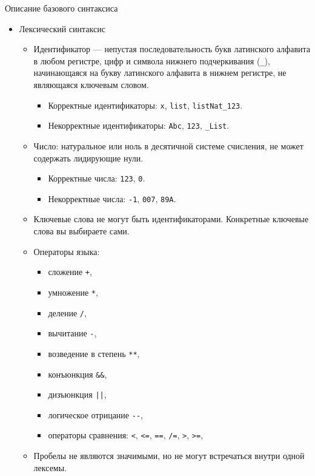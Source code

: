 \begin{center}
  {\Large Описание базового синтаксиса}
\end{center}
\begin{itemize}
  \item Лексический синтаксис
  \begin{itemize}
    \item Идентификатор --- непустая последовательность букв латинского алфавита в любом регистре, цифр и символа нижнего подчеркивания (\verb!_!), начинающаяся на букву латинского алфавита в нижнем регистре, не являющаяся ключевым словом.
    \begin{itemize}
      \item Корректные идентификаторы: \verb!x!, \verb!list!, \verb!listNat_123!.
      \item Некорректные идентификаторы: \verb!Abc!, \verb!123!, \verb!_List!.
    \end{itemize}
    \item Число: натуральное или ноль в десятичной системе счисления, не может содержать лидирующие нули.
    \begin{itemize}
      \item Корректные числа: \verb!123!, \verb!0!.
      \item Некорректные числа: \verb!-1!, \verb!007!, \verb!89A!.
    \end{itemize}
    \item Ключевые слова не могут быть идентификаторами. Конкретные ключевые слова вы выбираете сами.
    \item Операторы языка:
      \begin{itemize}
        \item сложение \verb!+!,
        \item умножение \verb!*!,
        \item деление \verb!/!,
        \item вычитание \verb!-!,
        \item возведение в степень \verb!**!,
        \item конъюнкция \verb!&&!,
        \item дизъюнкция \verb!||!,
        \item логическое отрицание \verb!--!,
        \item операторы сравнения: \verb!<!, \verb!<=!, \verb!==!, \verb!/=!, \verb!>!, \verb!>=!,
      \end{itemize}
    \item Пробелы не являются значимыми, но не могут встречаться внутри одной лексемы.

\end{itemize}
\end{itemize}
